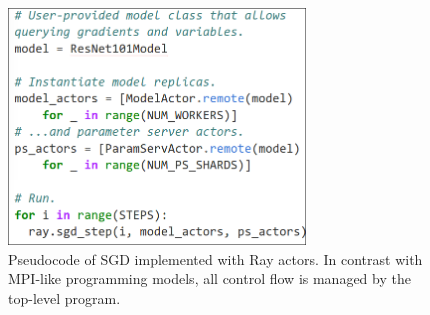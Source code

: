 \documentclass{article}
\begin{document}
\begin{figure}
    \centering
    \includegraphics[width=3.1in,keepaspectratio]{fig/pseudocode.png}
    \caption{
    \small{
        Pseudocode of SGD implemented with Ray actors. In contrast with MPI-like
        programming models, all control flow is managed by the top-level program.
    }
    }
    \label{fig:code}
\end{figure}






{
\footnotesize


}
\end{document}
